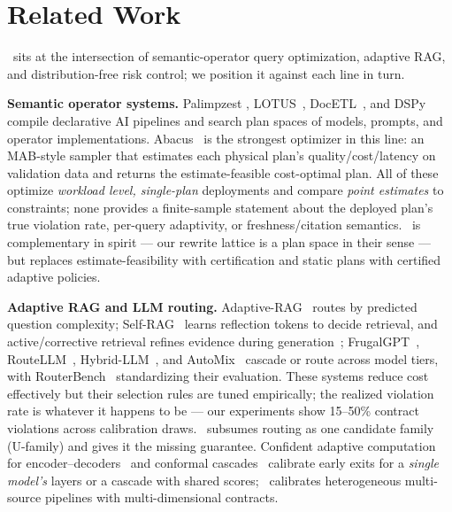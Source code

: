 \section{Related Work}
\label{sec:related}

\system\ sits at the intersection of semantic-operator query
optimization, adaptive RAG, and distribution-free risk control; we
position it against each line in turn.

\noindent\textbf{Semantic operator systems.} Palimpzest
\cite{liu2025palimpzest}, LOTUS~\cite{patel2024lotus},
DocETL~\cite{shankar2024docetl}, and DSPy~\cite{khattab2023dspy} compile
declarative AI pipelines and search plan spaces of models, prompts, and
operator implementations. Abacus~\cite{russo2025abacus} is the strongest
optimizer in this line: an MAB-style sampler that estimates each physical
plan's quality/cost/latency on validation data and returns the
estimate-feasible cost-optimal plan. All of these optimize \emph{workload
level, single-plan} deployments and compare \emph{point estimates} to
constraints; none provides a finite-sample statement about the deployed
plan's true violation rate, per-query adaptivity, or freshness/citation
semantics. \system\ is complementary in spirit --- our rewrite lattice is a
plan space in their sense --- but replaces estimate-feasibility with
certification and static plans with certified adaptive policies.

\noindent\textbf{Adaptive RAG and LLM routing.}
Adaptive-RAG~\cite{jeong2024adaptiverag} routes by predicted question
complexity; Self-RAG~\cite{asai2024selfrag} learns reflection tokens to
decide retrieval, and active/corrective retrieval refines evidence
during generation~\cite{jiang2023flare,yan2024corrective,xu2024recomp};
FrugalGPT~\cite{chen2023frugalgpt},
RouteLLM~\cite{ong2024routellm}, Hybrid-LLM~\cite{ding2024hybridllm},
and AutoMix~\cite{aggarwal2024automix} cascade or route across model
tiers, with RouterBench~\cite{hu2024routerbench} standardizing their
evaluation. These systems reduce cost effectively but their
selection rules are tuned empirically; the realized violation rate is
whatever it happens to be --- our experiments show 15--50\% contract
violations across calibration draws. \system\ subsumes routing as one
candidate family (U-family) and gives it the missing guarantee. Confident
adaptive computation for encoder--decoders~\cite{schuster2022calm} and
conformal cascades~\cite{fisch2021admission} calibrate early exits for a
\emph{single model's} layers or a cascade with shared scores; \system\
calibrates heterogeneous multi-source pipelines with multi-dimensional
contracts.

